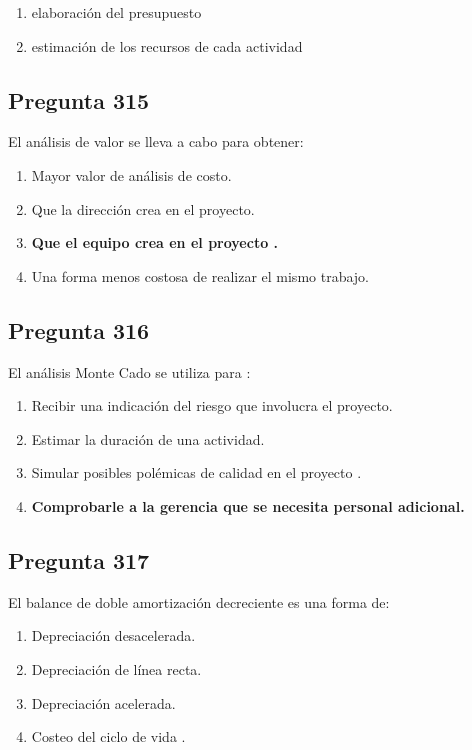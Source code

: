 \documentclass[11pt,a4paper]{article}
\begin{document}
\begin{enumerate}[label=\alph*)]
  \item elaboración del presupuesto
  \item estimación de los recursos de cada actividad
\end{enumerate}

\subsection*{Pregunta 315}
El análisis de valor se lleva a cabo para obtener:

\begin{enumerate}[label=\alph*)]
  \item Mayor valor de análisis de costo.
  \item Que la dirección crea en el proyecto.
  \item \textbf{Que el equipo crea en el proyecto .}
  \item Una forma menos costosa de realizar el mismo trabajo.
\end{enumerate}

\subsection*{Pregunta 316}
El análisis Monte Cado se utiliza para :

\begin{enumerate}[label=\alph*)]
  \item Recibir una indicación del riesgo que involucra el proyecto.
  \item Estimar la duración de una actividad.
  \item Simular posibles polémicas de calidad en el proyecto .
  \item \textbf{Comprobarle a la gerencia que se necesita personal adicional.}
\end{enumerate}

\subsection*{Pregunta 317}
El balance de doble amortización decreciente es una forma de:

\begin{enumerate}[label=\alph*)]
  \item Depreciación desacelerada.
  \item Depreciación de línea recta.
  \item Depreciación acelerada.
  \item Costeo del ciclo de vida .
\end{enumerate}
\end{document}

